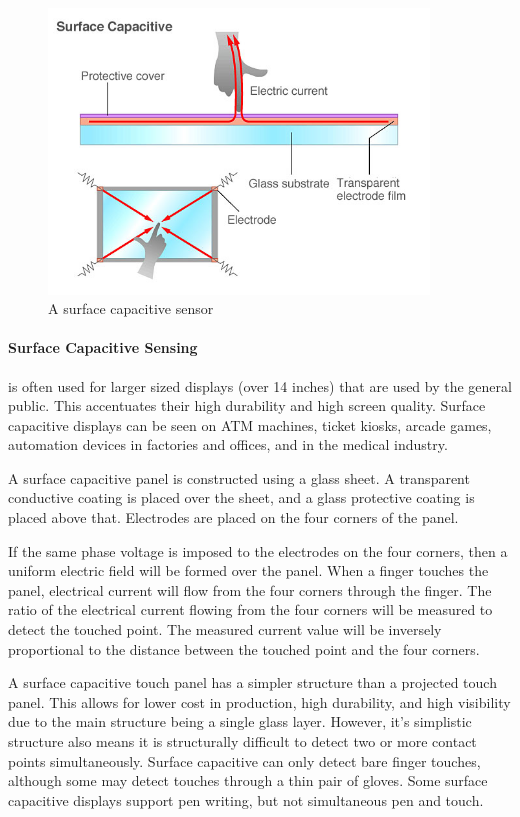 \documentclass[11pt]{report}
\begin{document}
\begin{center}
\begin{figure}
\includegraphics[width=0.9\textwidth]{surcap}
\caption{A surface capacitive sensor}
\end{figure}
\end{center}

\paragraph{Surface Capacitive Sensing}

is often used for larger sized displays (over 14 inches) that are used by the general public.
This accentuates their high durability and high screen quality.
Surface capacitive displays can be seen on ATM machines, ticket kiosks, arcade games, automation devices in factories and offices, and in the medical industry.

A surface capacitive panel is constructed using a glass sheet. 
A transparent conductive coating is placed over the sheet, and a glass protective coating is placed above that. 
Electrodes are placed on the four corners of the panel. 

If the same phase voltage is imposed to the electrodes on the four corners, then a uniform electric field will be formed over the panel. 
When a finger touches the panel, electrical current will flow from the four corners through the finger. 
The ratio of the electrical current flowing from the four corners will be measured to detect the touched point. 
The measured current value will be inversely proportional to the distance between the touched point and the four corners.

A surface capacitive touch panel has a simpler structure than a projected touch panel.
This allows for lower cost in production, high durability, and high visibility due to the main structure being a single glass layer. 
However, it's simplistic structure also means it is structurally difficult to detect two or more contact points simultaneously.
Surface capacitive can only detect bare finger touches, although some may detect touches through a thin pair of gloves.
Some surface capacitive displays support pen writing, but not simultaneous pen and touch.
\end{document}
